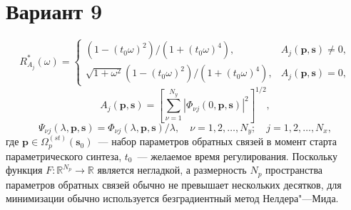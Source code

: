 \documentclass{article}
\begin{document}
\section*{Вариант 9}
\begin{equation}
R^{*}_{A_j}(\omega) =
\begin{cases}
(1 - (t_0\omega)^2) / (1 + (t_0\omega)^4), & A_j(\mathbf{p}, \mathbf{s}) \neq 0, \\
\sqrt{1 + \omega^2}(1 - (t_0\omega)^2) / (1 + (t_0\omega)^4), & A_j(\mathbf{p}, \mathbf{s}) = 0,
\end{cases}
\end{equation}
\begin{equation*}
A_j(\mathbf{p}, \mathbf{s}) = \left[\sum\limits_{\nu=1}^{N_y} |\Phi_{\nu j}(0, \mathbf{p}, \mathbf{s})|^2\right]^{1/2},
\end{equation*}
\begin{equation*}
\Psi_{\nu j}(\lambda, \mathbf{p}, \mathbf{s}) = \Phi_{\nu j}(\lambda, \mathbf{p}, \mathbf{s}) / \lambda,
\quad \nu = 1, 2, \dots, N_y; \quad j = 1, 2, \dots, N_x,
\end{equation*}
где $\mathbf{p} \in \Omega^{(st)}_p(\mathbf{s}_0)$~--- набор параметров обратных связей в момент
старта параметрического синтеза, $t_0$~--- желаемое время регулирования.
Поскольку функция $F : \mathbb{R}^{N_p} \to \mathbb{R}$ является негладкой,
а размерность $N_p$ пространства параметров обратных связей обычно не превышает
нескольких десятков, для минимизации обычно используется безградиентный метод
Нелдера"---Мида.
\end{document}
